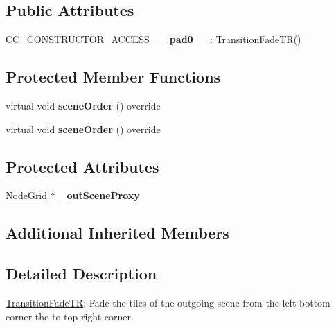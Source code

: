 \subsection*{Public Attributes}
\begin{DoxyCompactItemize}
\item 
\mbox{\label{classTransitionFadeTR_ae2c6202a579e4d9c144910386c36ed3f}} 
\hyperlink{_2cocos2d_2cocos_2base_2ccConfig_8h_a25ef1314f97c35a2ed3d029b0ead6da0}{C\+C\+\_\+\+C\+O\+N\+S\+T\+R\+U\+C\+T\+O\+R\+\_\+\+A\+C\+C\+E\+SS} {\bfseries \+\_\+\+\_\+pad0\+\_\+\+\_\+}\+: \hyperlink{classTransitionFadeTR}{Transition\+Fade\+TR}()
\end{DoxyCompactItemize}
\subsection*{Protected Member Functions}
\begin{DoxyCompactItemize}
\item 
\mbox{\label{classTransitionFadeTR_a5d69598ca2c6cade69c9ce14ed056bed}} 
virtual void {\bfseries scene\+Order} () override
\item 
\mbox{\label{classTransitionFadeTR_a13c18d2100b52f6f63c299cf1c520740}} 
virtual void {\bfseries scene\+Order} () override
\end{DoxyCompactItemize}
\subsection*{Protected Attributes}
\begin{DoxyCompactItemize}
\item 
\mbox{\label{classTransitionFadeTR_ac247fa68ef6c2e3456f94072fa9dd938}} 
\hyperlink{classNodeGrid}{Node\+Grid} $\ast$ {\bfseries \+\_\+out\+Scene\+Proxy}
\end{DoxyCompactItemize}
\subsection*{Additional Inherited Members}


\subsection{Detailed Description}
\hyperlink{classTransitionFadeTR}{Transition\+Fade\+TR}\+: Fade the tiles of the outgoing scene from the left-\/bottom corner the to top-\/right corner. 

